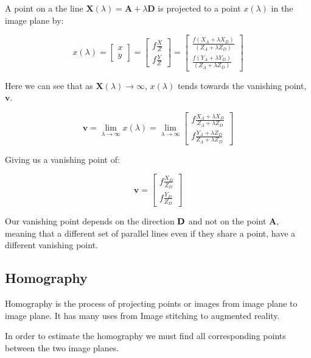 \documentclass{article}
\begin{document}
A point on a the line $\mathbf{X}(\lambda) = \mathbf{A} + \lambda \mathbf{D}   $ is projected to a point $x(\lambda)$ in the image plane by:

\[
  x(\lambda) = \begin{bmatrix}
    x\\y
  \end{bmatrix} = \begin{bmatrix}
    f \frac{X}{Z}\\ f \frac{Y}{Z}
  \end{bmatrix}=
  \begin{bmatrix}
    \frac{f(X_{A} + \lambda X_{D})}{(Z_{A}+ \lambda Z_{D})}\\
    \frac{f(Y_{A}+\lambda Y_{D})}{(Z_{A}+ \lambda Z_{D})}
  \end{bmatrix}
\]

Here we can see that as $\mathbf{X}(\lambda) \rightarrow \infty $, $x(\lambda)$ tends towards the vanishing point, $\mathbf{v} $.


\[
  \mathbf{v} = \lim_{\lambda \to \infty}x(\lambda) = \lim_{\lambda \to \infty} \begin{bmatrix}
    f \frac{X_{A}+ \lambda X_{D}}{Z_{A}+ \lambda Z_{D}} \\
    f \frac{Y_{A}+ \lambda Z_{D}}{Z_{A} + \lambda Z_{D}}
  \end{bmatrix}
\]

Giving us a vanishing point of:

\[
  \mathbf{v} = \begin{bmatrix}
    f \frac{X_{D}}{Z_{D}} \\
    f \frac{Y_{D}}{Z_{D}}
  \end{bmatrix}
\]

Our vanishing point depends on the direction $\bf D$ and not on the point $\mathbf{A} $, meaning that a different set of parallel lines even if they share a point, have a different vanishing point.

\subsection{Homography}
\label{subsec:homography}

Homography is the process of projecting points or images from image plane to image plane. It has many uses from Image stitching to augmented reality.

In order to estimate the homography we must find all corresponding points between the two image planes.
\end{document}
